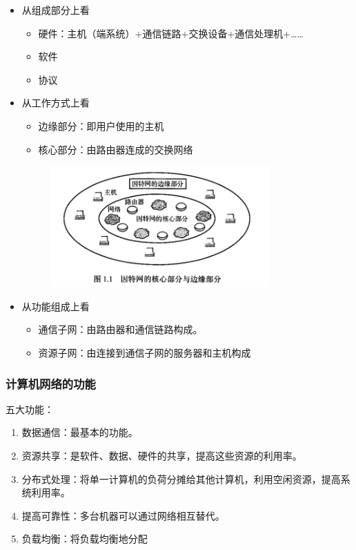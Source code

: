 \documentclass[12pt, a4paper, oneside]{ctexart}
\begin{document}
\begin{itemize}
    \item 从组成部分上看
    \begin{itemize}
        \item 硬件：主机（端系统）+通信链路+交换设备+通信处理机+……
        \item 软件
        \item 协议
    \end{itemize}
    \item 从工作方式上看
    \begin{itemize}
        \item 边缘部分：即用户使用的主机
        \item 核心部分：由路由器连成的交换网络
    \end{itemize}
    \begin{figure}
        \centering
        \includegraphics[width=0.8\textwidth]{./images/network_core_and_edge.png}
    \end{figure}
    \item 从功能组成上看
    \begin{itemize}
        \item 通信子网：由路由器和通信链路构成。
        \item 资源子网：由连接到通信子网的服务器和主机构成
    \end{itemize}
\end{itemize}

\subsubsection{计算机网络的功能}

五大功能：
\begin{enumerate}
    \item 数据通信：最基本的功能。
    \item 资源共享：是软件、数据、硬件的共享，提高这些资源的利用率。
    \item 分布式处理：将单一计算机的负荷分摊给其他计算机，利用空闲资源，提高系统利用率。
    \item 提高可靠性：多台机器可以通过网络相互替代。
    \item 负载均衡：将负载均衡地分配
\end{enumerate}
\end{document}
